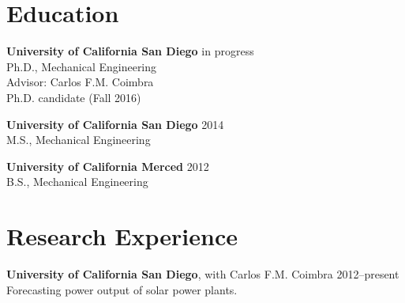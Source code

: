 \documentclass[]{res}
\begin{document}
\address{University of California San Diego \\ 9500 Gilman Drive \#0411 \\ La Jolla, CA 92093--0411}
\address{\hfill \href{mailto:dplarson@ucsd.edu}{dplarson@ucsd.edu} \\
    \hfill \url{http://ieng6.ucsd.edu/~dplarson} \\
    \hfill \url{http://github.com/dplarson}
}


\begin{resume}


\section{Education}
\vspace{0.1in}

\textbf{University of California San Diego} \hfill in progress \\
Ph.D., Mechanical Engineering \\
Advisor: Carlos F.M. Coimbra \\
Ph.D. candidate (Fall 2016) \\

\vspace{-0.2in}

\textbf{University of California San Diego} \hfill 2014 \\
M.S., Mechanical Engineering \\

\vspace{-0.2in}

\textbf{University of California Merced} \hfill 2012 \\
B.S., Mechanical Engineering


\section{Research Experience}
\vspace{0.1in}

\textbf{University of California San Diego}, with Carlos F.M. Coimbra \hfill 2012--present\\
Forecasting power output of solar power plants.


\end{resume}
\end{document}
